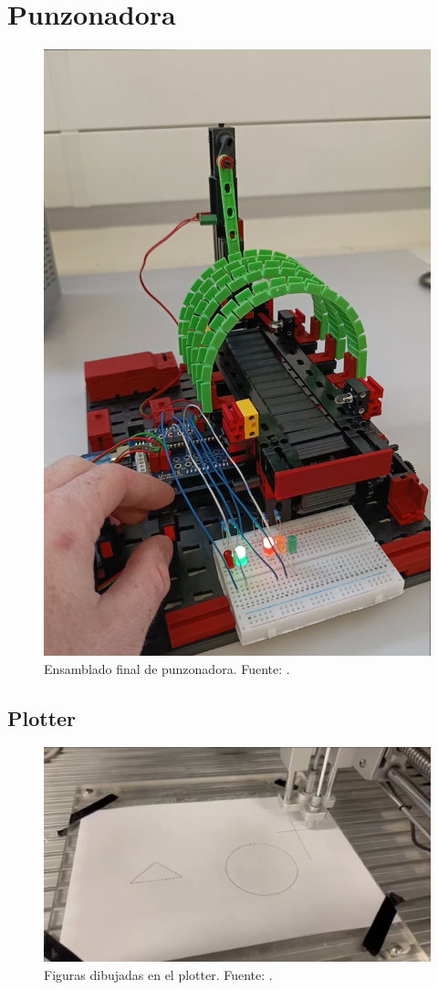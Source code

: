 \section{Punzonadora}

\begin{figure}[H]
  \centering
  \includegraphics[width=0.7\linewidth]{./Anexos/Resultados/Punzonadora/Circuito.jpg}
  \caption{Ensamblado final de punzonadora. Fuente: \cite{LabDrive}.}
  \label{fig:punzonadora_circuito}
\end{figure}


\subsection{Plotter}
\begin{figure}[H]
  \centering
  \includegraphics[width=\linewidth]{./Anexos/Resultados/Plotter/Dibujos.jpg}
  \caption{Figuras dibujadas en el plotter. Fuente: \cite{LabDrive}.}
  \label{fig:plotter_figuras}
\end{figure}